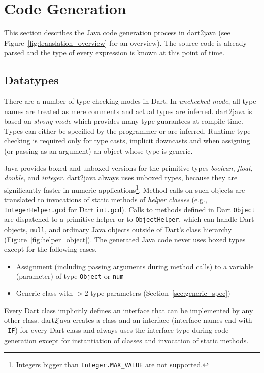 \documentclass[sigplan,9pt]{acmart}
\begin{document}
\section{Code Generation}
This section describes the Java code generation process in dart2java (see Figure~\ref{fig:translation_overview} for an overview). The source code is already parsed and the type of every expression is known at this point of time.

\subsection{Datatypes}
There are a number of type checking modes in Dart. In \emph{unchecked mode}, all type names are treated as mere comments and actual types are inferred. dart2java is based on \emph{strong mode} which provides many type guarantees at compile time. Types can either be specified by the programmer or are inferred. Runtime type checking is required only for type casts, implicit downcasts and when assigning (or passing as an argument) an object whose type is generic.

Java provides boxed and unboxed versions for the primitive types \emph{boolean}, \emph{float}, \emph{double}, and \emph{integer}. dart2java always uses unboxed types, because they are significantly faster in numeric applications\footnote{Integers bigger than \texttt{Integer.MAX\_VALUE} are not supported.}. Method calls on such objects are translated to invocations of static methods of \emph{helper classes} (e.g., \texttt{IntegerHelper.gcd} for Dart \texttt{int.gcd}).  Calls to methods defined in Dart \texttt{Object} are dispatched to a primitive helper or to \texttt{ObjectHelper}, which can handle Dart objects, \texttt{null}, and ordinary Java objects outside of Dart's class hierarchy (Figure~\ref{fig:helper_object}). The generated Java code never uses boxed types except for the following cases.
\begin{itemize}
    \item Assignment (including passing arguments during method calls) to a variable (parameter) of type \texttt{Object} or \texttt{num}
    \item Generic class with $>2$ type parameters (Section~\ref{sec:generic_spec})
\end{itemize}

Every Dart class implicitly defines an interface that can be implemented by any other class. dart2java creates a class and an interface (interface names end with \texttt{\_IF}) for every Dart class and always uses the interface type during code generation except for instantiation of classes and invocation of static methods.
\end{document}
